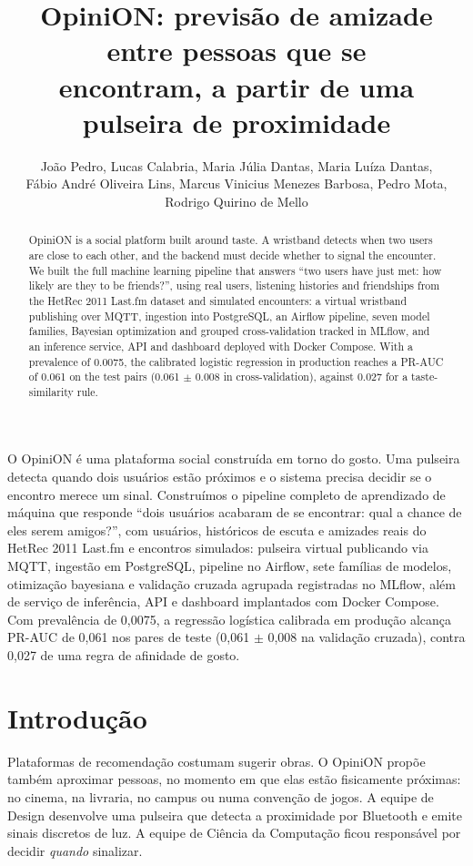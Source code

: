 \documentclass[12pt]{article}
\title{OpiniON: previsão de amizade entre pessoas que se\\ encontram, a partir de uma pulseira de proximidade}
\author{João Pedro\inst{1}, Lucas Calabria\inst{1}, Maria Júlia Dantas\inst{1},
  Maria Luíza Dantas\inst{1},\\ Fábio André Oliveira Lins\inst{1},
  Marcus Vinicius Menezes Barbosa\inst{1}, Pedro Mota\inst{1},\\ Rodrigo Quirino de Mello\inst{1}}
\begin{document}
\maketitle

\begin{abstract}
  OpiniON is a social platform built around taste. A wristband detects when two users are close to
  each other, and the backend must decide whether to signal the encounter. We built the full machine
  learning pipeline that answers ``two users have just met: how likely are they to be friends?'', using
  real users, listening histories and friendships from the HetRec 2011 Last.fm dataset and simulated
  encounters: a virtual wristband publishing over MQTT, ingestion into PostgreSQL, an Airflow pipeline,
  seven model families, Bayesian optimization and grouped cross-validation tracked in MLflow, and an
  inference service, API and dashboard deployed with Docker Compose. With a prevalence of 0.0075, the
  calibrated logistic regression in production reaches a PR-AUC of 0.061 on the test pairs (0.061 $\pm$
  0.008 in cross-validation), against 0.027 for a taste-similarity rule.
\end{abstract}

\begin{resumo}
  O OpiniON é uma plataforma social construída em torno do gosto. Uma pulseira detecta quando dois
  usuários estão próximos e o sistema precisa decidir se o encontro merece um sinal. Construímos o
  pipeline completo de aprendizado de máquina que responde ``dois usuários acabaram de se encontrar:
  qual a chance de eles serem amigos?'', com usuários, históricos de escuta e amizades reais do
  HetRec 2011 Last.fm e encontros simulados: pulseira virtual publicando via MQTT, ingestão em
  PostgreSQL, pipeline no Airflow, sete famílias de modelos, otimização bayesiana e validação cruzada
  agrupada registradas no MLflow, além de serviço de inferência, API e dashboard implantados com Docker
  Compose. Com prevalência de 0,0075, a regressão logística calibrada em produção alcança PR-AUC de
  0,061 nos pares de teste (0,061 $\pm$ 0,008 na validação cruzada), contra 0,027 de uma regra de
  afinidade de gosto.
\end{resumo}

\section{Introdução}

Plataformas de recomendação costumam sugerir obras. O OpiniON propõe também aproximar pessoas, no
momento em que elas estão fisicamente próximas: no cinema, na livraria, no campus ou numa convenção de
jogos. A equipe de Design desenvolve uma pulseira que detecta a proximidade por Bluetooth e emite sinais
discretos de luz. A equipe de Ciência da Computação ficou responsável por decidir \emph{quando}
sinalizar.
\end{document}
